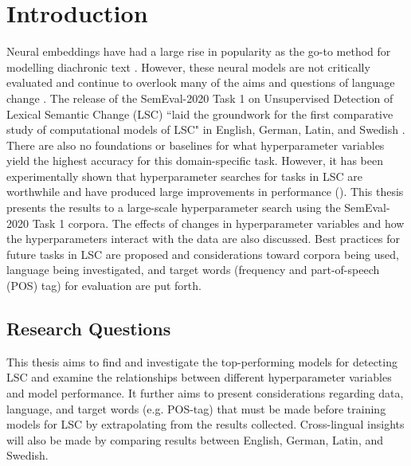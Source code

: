 

\section{Introduction}
\label{sec:intro}

Neural embeddings have had a large rise in popularity as the go-to method for modelling diachronic text \citep{diachronicwordembeddingssurvey-kutuzov2018, tahmasebi-survey2018}. However, these neural models are not critically evaluated and continue to overlook many of the aims and questions of language change \citep{hengchen2021challenges}. The release of the SemEval-2020 Task 1 on Unsupervised Detection of Lexical Semantic Change (LSC) \citep{schlechtweg-etal-2020-semeval} ``laid the groundwork for the first comparative study of computational models of LSC" in English, German, Latin, and Swedish \citep{hengchen2021SBXrushifteval}. There are also no foundations or baselines for what hyperparameter variables yield the highest accuracy for this domain-specific task. However, it has been experimentally shown that hyperparameter searches for tasks in LSC are worthwhile and have produced large improvements in performance (\citet{kaiser-etal-2020-ims, hengchen2021SBXrushifteval}). This thesis presents the results to a large-scale hyperparameter search using the SemEval-2020 Task 1 corpora. The effects of changes in hyperparameter variables and how the hyperparameters interact with the data are also discussed. Best practices for future tasks in LSC are proposed and considerations toward corpora being used, language being investigated, and target words (frequency and part-of-speech (POS) tag) for evaluation are put forth. 


\subsection{Research Questions}
This thesis aims to find and investigate the top-performing models for detecting LSC and examine the relationships between different hyperparameter variables and model performance. It further aims to present considerations regarding data, language, and target words (e.g. POS-tag) that must be made before training models for LSC by extrapolating from the results collected. Cross-lingual insights will also be made by comparing results between English, German, Latin, and Swedish. 

